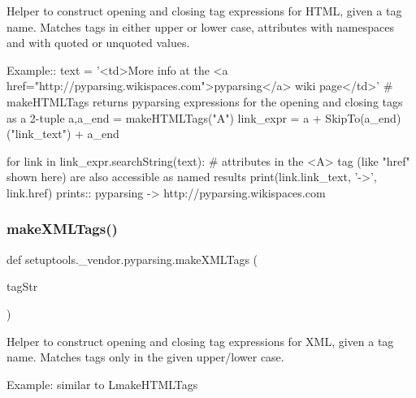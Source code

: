 \begin{DoxyVerb}Helper to construct opening and closing tag expressions for HTML, given a tag name. Matches
tags in either upper or lower case, attributes with namespaces and with quoted or unquoted values.

Example::
    text = '<td>More info at the <a href="http://pyparsing.wikispaces.com">pyparsing</a> wiki page</td>'
    # makeHTMLTags returns pyparsing expressions for the opening and closing tags as a 2-tuple
    a,a_end = makeHTMLTags("A")
    link_expr = a + SkipTo(a_end)("link_text") + a_end
    
    for link in link_expr.searchString(text):
        # attributes in the <A> tag (like "href" shown here) are also accessible as named results
        print(link.link_text, '->', link.href)
prints::
    pyparsing -> http://pyparsing.wikispaces.com
\end{DoxyVerb}
 \mbox{\label{namespacesetuptools_1_1__vendor_1_1pyparsing_a8ef4a9d193391ee88167f67877bf1a58}} 
\subsubsection{\texorpdfstring{make\+X\+M\+L\+Tags()}{makeXMLTags()}}
{\footnotesize\ttfamily def setuptools.\+\_\+vendor.\+pyparsing.\+make\+X\+M\+L\+Tags (\begin{DoxyParamCaption}\item[{}]{tag\+Str }\end{DoxyParamCaption})}

\begin{DoxyVerb}Helper to construct opening and closing tag expressions for XML, given a tag name. Matches
tags only in the given upper/lower case.

Example: similar to L{makeHTMLTags}
\end{DoxyVerb}
 \mbox{\label{namespacesetuptools_1_1__vendor_1_1pyparsing_adb693a5f976aa57e77f9d237450b5157}} 
